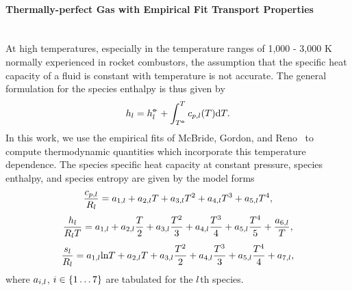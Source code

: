 \paragraph*{Thermally-perfect Gas with Empirical Fit Transport Properties}\mbox{}\\

At high temperatures, especially in the temperature ranges of 1,000 - 3,000 K normally experienced in rocket combustors, the assumption that the specific heat capacity of a fluid is constant with temperature is not accurate. The general formulation for the species enthalpy is thus given by
%
\begin{eqnarray}
	h_{l} = h^{\circ\kern-0.47em-}_{l} + \int_{T^{\circ\kern-0.47em-}}^{T} c_{p,l}(T) \text{d}T.
\end{eqnarray}
%
In this work, we use the empirical fits of McBride, Gordon, and Reno~\cite{McBride1993} to compute thermodynamic quantities which incorporate this temperature dependence. The species specific heat capacity at constant pressure, species enthalpy, and species entropy are given by the model forms
%
\begin{equation}
	\frac{c_{p,l}}{R_{l}} = a_{1,l} + a_{2,l} T + a_{3,l} T^2 + a_{4,l} T^3 + a_{5,l} T^4,
\end{equation}
%
\begin{equation}
	\frac{h_{l}}{R_{l} T} = a_{1,l} + a_{2,l} \frac{T}{2} + a_{3,l} \frac{T^2}{3} + a_{4,l} \frac{T^3}{4} + a_{5,l} \frac{T^4}{5} + \frac{a_{6,l}}{T},
\end{equation}
%
\begin{equation}
	\frac{s_{l}}{R_{l}} = a_{1,l} \text{ln}T + a_{2,l} T + a_{3,l} \frac{T^2}{2} + a_{4,l} \frac{T^3}{3} + a_{5,l} \frac{T^4}{4} + a_{7,l},
\end{equation}
%
where $a_{i,l}$, $i \in \{1 \hdots 7\}$ are tabulated for the $l$th species.

